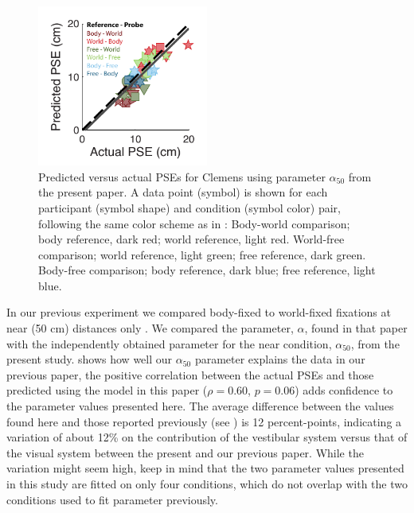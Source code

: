 \begin{figure}
    \includegraphics[width=0.5\textwidth]{src/paper4/p4_figure6.pdf}

    \caption{Predicted versus actual PSEs for Clemens \protect\citeyear{clemens2015a} using parameter $\alpha_{50}$ from the present paper. A data point (symbol) is shown for each participant (symbol shape) and condition (symbol color) pair, following the same color scheme as in \protect{}: Body-world comparison; body reference, dark red; world reference, light red. World-free comparison; world reference, light green; free reference, dark green. Body-free comparison; body reference, dark blue; free reference, light blue.}
    \label{p4:fig6}
\end{figure}

In our previous experiment we compared body-fixed to world-fixed fixations at near (50 \si{\centi\metre}) distances only \cite{clemens2015a}. We compared the parameter, $\alpha$, found in that paper with the independently obtained parameter for the near condition, $\alpha_{50}$, from the present study.  shows how well our $\alpha_{50}$ parameter explains the data in our previous paper, the positive correlation between the actual PSEs and those predicted using the model in this paper ($\rho = 0.60$, $p = 0.06$) adds confidence to the parameter values presented here. The average difference between the values found here and those reported previously (see ) is 12  percent-points, indicating a variation of about 12\% on the contribution of the vestibular system versus that of the visual system between the present and our previous paper. While the variation might seem high, keep in mind that the two parameter values presented in this study are fitted on only four conditions, which do not overlap with the two conditions used to fit  parameter previously.

